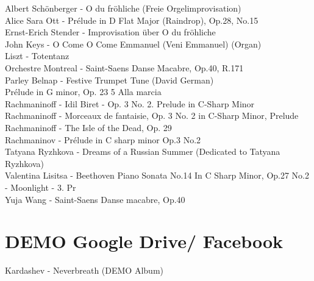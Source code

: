 Albert Schönberger - O du fröhliche (Freie Orgelimprovisation)\\
Alice Sara Ott - Prélude in D Flat Major (Raindrop), Op.28, No.15\\
Ernst-Erich Stender - Improvisation über O du fröhliche\\
John Keys - O Come O Come Emmanuel (Veni Emmanuel) (Organ)\\
Liszt - Totentanz\\
Orchestre Montreal - Saint-Saens Danse Macabre, Op.40, R.171\\
Parley Belnap - Festive Trumpet Tune (David German)\\
Prélude in G minor, Op. 23 5 Alla marcia\\
Rachmaninoff - Idil Biret - Op. 3 No. 2. Prelude in C-Sharp Minor\\
Rachmaninoff - Morceaux de fantaisie, Op. 3 No. 2 in C-Sharp Minor, Prelude\\
Rachmaninoff - The Isle of the Dead, Op. 29\\
Rachmaninov - Prélude in C sharp minor Op.3 No.2\\
Tatyana Ryzhkova - Dreams of a Russian Summer (Dedicated to Tatyana Ryzhkova)\\
Valentina Lisitsa - Beethoven Piano Sonata No.14 In C Sharp Minor, Op.27 No.2 - Moonlight - 3. Pr\\
Yuja Wang - Saint-Saens Danse macabre, Op.40\\

\section{DEMO Google Drive/ Facebook}

Kardashev - Neverbreath (DEMO Album)

%

